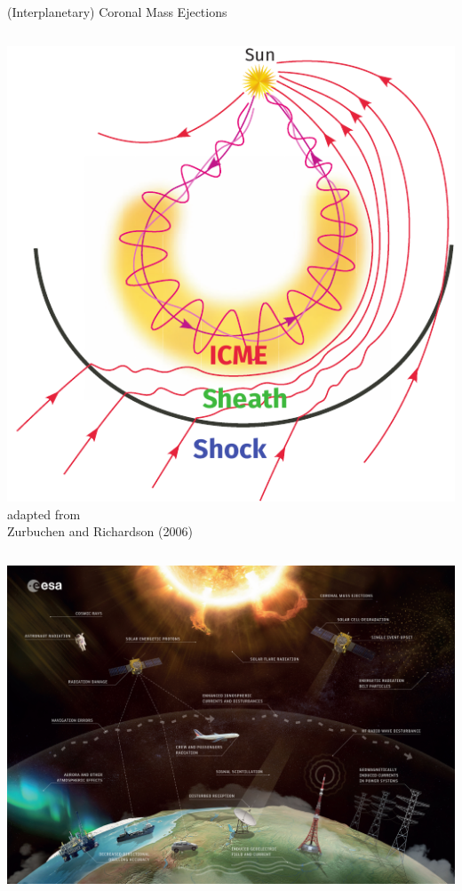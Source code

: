 \documentclass[10pt,aspectratio=169,usenames,dvipsnames]{beamer}
\begin{document}
\begin{frame}{(Interplanetary) Coronal Mass Ejections}
\begin{columns}
\begin{column}{0.45\textwidth}
            \includegraphics[width=\textwidth]{images/ZurbuchenRichardson-adapted.pdf}\\
            \scriptsize adapted from\\Zurbuchen and Richardson (2006)
        \end{column}
    \end{columns}
\end{frame}

\begin{frame}[standout]          
    \includegraphics[height=\paperheight]{images/Space_weather_effects.jpg}
\end{frame}
\end{document}

